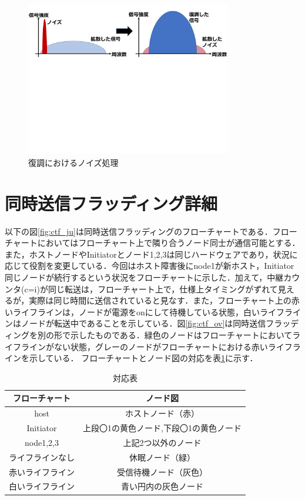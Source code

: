 \begin{figure}[H]
  \centering
  \includegraphics[width=0.8\textwidth]{figures/7.pdf}
  \vspace{-50mm}
  \caption{復調におけるノイズ処理}
  \label{fig:DSSS2}
\end{figure}

\section{同時送信フラッディング詳細}
以下の図\ref{fig:ctf_ju}は同時送信フラッディングのフローチャートである．フローチャートにおいてはフローチャート上で隣り合うノード同士が通信可能とする．また，ホストノードやInitiatorとノード1,2,3は同じハードウェアであり，状況に応じて役割を変更している．今回はホスト障害後にnode1が新ホスト，Initiator同じノードが続行するという状況をフローチャートに示した．加えて，中継カウンタ(c=i)が同じ転送は，フローチャート上で，仕様上タイミングがずれて見えるが，実際は同じ時間に送信されていると見なす．また，フローチャート上の赤いライフラインは，ノードが電源をonにして待機している状態，白いライフラインはノードが転送中であることを示している．図\ref{fig:ctf_ov}は同時送信フラッディングを別の形で示したものである．緑色のノードはフローチャートにおいてライフラインがない状態，グレーのノードがフローチャートにおける赤いライフラインを示している．
フローチャートとノード図の対応を表\ref{tab:taio}に示す．

\begin{table}[H]
  \caption{対応表}
  \begin{tabular}{c|c} \hline \hline
     フローチャート& ノード図  \\\hline
     host&ホストノード（赤）\\
    Initiator&上段〇1の黄色ノード,下段〇1の黄色ノード\\
    node1,2,3&上記2つ以外のノード\\\hline
     ライフラインなし & 休眠ノード（緑）\\
     赤いライフライン & 受信待機ノード（灰色）\\
     白いライフライン & 青い円内の灰色ノード\\\hline\hline
  \end{tabular}
  \label{tab:taio}
\end{table}

